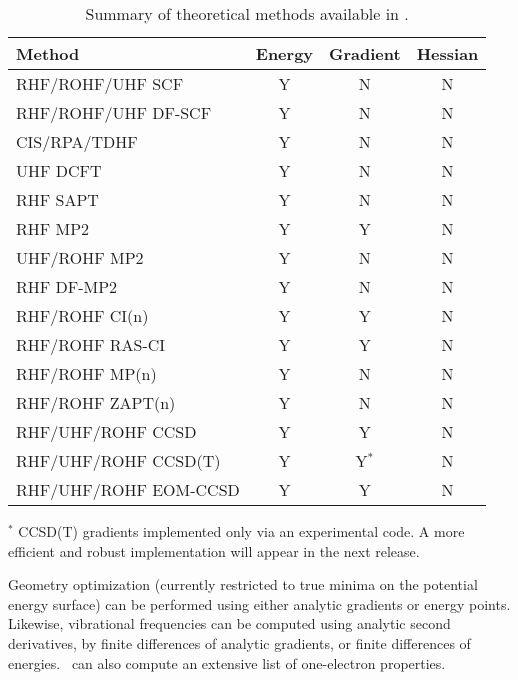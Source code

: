 \begin{table}
\caption{Summary of theoretical methods available in \PSIfour.} \label{table:methods}
\parsep 10pt
\begin{center}
\begin{tabular}{lccc} \hline\hline
Method                & Energy & Gradient & Hessian \\ \hline
RHF/ROHF/UHF SCF     & Y & N & N \\
RHF/ROHF/UHF DF-SCF   & Y & N & N \\
CIS/RPA/TDHF          & Y & N & N \\
UHF DCFT              & Y & N & N \\
RHF SAPT              & Y & N & N \\
RHF MP2               & Y & Y & N \\
UHF/ROHF MP2          & Y & N & N \\
RHF DF-MP2            & Y & N & N \\
RHF/ROHF CI(n)        & Y & Y & N \\
RHF/ROHF RAS-CI       & Y & Y & N \\
RHF/ROHF MP(n)        & Y & N & N \\
RHF/ROHF ZAPT(n)      & Y & N & N \\
RHF/UHF/ROHF CCSD     & Y & Y & N \\
RHF/UHF/ROHF CCSD(T)  & Y & Y$^*$ & N \\
RHF/UHF/ROHF EOM-CCSD & Y & Y & N \\
\hline\hline
\end{tabular}
\end{center}
\footnotesize{$^*$ CCSD(T) gradients implemented only via an experimental
code.  A more efficient and robust implementation will appear in the next
release.}
\end{table}
Geometry optimization (currently restricted to true minima on the potential
energy surface) can be performed using either analytic gradients
or energy points.  Likewise, vibrational frequencies can be 
computed using analytic second derivatives, by finite
differences of analytic gradients, or finite differences of energies.
\PSIfour\ can also compute an extensive list of one-electron properties.

